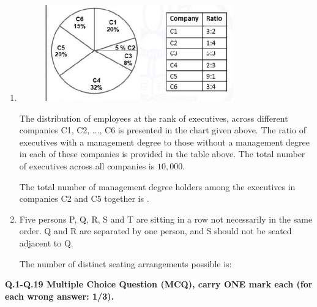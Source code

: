 \documentclass[journal]{IEEEtran}
\begin{document}
\begin{enumerate}[leftmargin=0pt]
\hfill{}

\item 
\begin{figure}[h]
\centering
\includegraphics[width=0.5\columnwidth]{Figs/image (40).png}
\caption*{}
\label{fig:9}
\end{figure}
\newpage
The distribution of employees at the rank of executives, across different
companies C1, C2, ..., C6 is presented in the chart given above. The ratio of
executives with a management degree to those without a management degree
in each of these companies is provided in the table above. The total number
of executives across all companies is $10,000$.

The total number of management degree holders among the executives in
companies C2 and C5 together is \underline{\hspace{2cm}}.

\hfill{}

\item Five persons P, Q, R, S and T are sitting in a row not necessarily in the same
order. Q and R are separated by one person, and S should not be seated
adjacent to Q.

The number of distinct seating arrangements possible is:

\begin{enumerate}
\end{enumerate}

\hfill{}
\end{enumerate}
\textbf{Q.1-Q.19 Multiple Choice Question (MCQ), carry ONE mark each (for each wrong answer: 1/3).}
\end{document}
